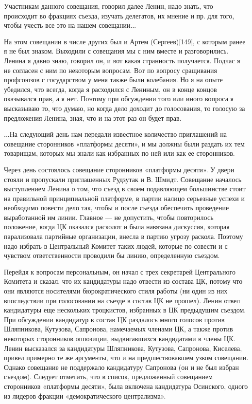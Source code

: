 \documentclass[12pt, a4paper, openany]{book}
\begin{document}
Участникам данного совещания, говорил далее Ленин, надо знать, что происходит во фракциях съезда, изучать делегатов, их мнение и пр. для того, чтобы учесть все это на нашем совещании...

На этом совещании в числе других был и Артем (Сергеев)[149], с которым ранее я не был знаком. Выходили с совещания мы с ним вместе и разговорились. Ленина я давно знаю, говорил он, и вот какая странность получается. Подчас я не согласен с ним по некоторым вопросам. Вот по вопросу сращивания профсоюзов с государством у меня также были колебания. Но я на опыте убедился, что всегда, когда я расходился с Лениным, он в конце концов оказывался прав, а я нет. Поэтому при обсуждении того или иного вопроса я высказываю то, что думаю, но когда дело доходит до голосования, то голосую за предложения Ленина, зная, что и на этот раз он будет прав.

...На следующий день нам передали известное количество приглашений на совещание сторонников «платформы десяти», и мы должны были раздать их тем товарищам, которых мы знали как избранных по ней или как ее сторонников.

Через день состоялось совещание сторонников «платформы десяти». У двери стояли и пропускали приглашенных Рудзутак и В. Шмидт. Совещание началось выступлением Ленина о том, что съезд в своем подавляющем большинстве стоит на правильной принципиальной платформе, в партии налицо серьезные успехи и необходимо повести дело так, чтобы и после съезда обеспечить проведение выработанной им линии. Главное — не допустить, чтобы повторилось положение, когда ЦК оказался расколот и была навязана дискуссия, которая парализовала партийные организации, внесла в партию угрозу раскола. Поэтому надо избрать в Центральный Комитет таких людей, которые по совести и с чувством ответственности проводили бы линию, определенную съездом.

Перейдя к вопросам персональным, он начал с трех секретарей Центрального Комитета и сказал, что их кандидатуры надо отвести из состава ЦК, потому что они являются носителями бюрократического стиля работы (ни один из них впоследствии при голосовании на съезде в состав ЦК не прошел). Ленин отвел кандидатуры еще нескольких троцкистов, избранных в ЦК предыдущим съездом. При обсуждении кандидатур в состав ЦК раздалось много голосов против Шляпникова, Кутузова, Сапронова, намечаемых членами ЦК, а также против некоторых сторонников оппозиции, выдвигавшихся кандидатами в члены ЦК. Ленин высказался за кандидатуры Шляпникова, Кутузова, Сапронова, Киселева, привел примерно те же аргументы, что и на предшествовавшем узком совещании. Однако совещание не поддержало кандидатуру Сапронова (он и не был избран съездом). Следует отметить, что в список, предложенный совещанием сторонников «платформы десяти», была включена кандидатура Осинского, одного из лидеров фракции «демократического централизма».
\end{document}

